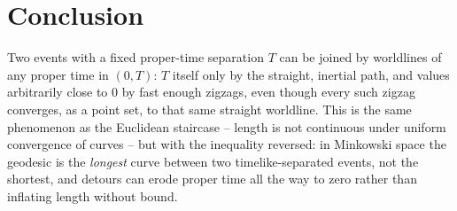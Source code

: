 \documentclass[11pt]{article}
\begin{document}
\section{Conclusion}

Two events with a fixed proper-time separation $T$ can be joined by
worldlines of any proper time in $(0,T)$: $T$ itself only by the straight,
inertial path, and values arbitrarily close to $0$ by fast enough zigzags,
even though every such zigzag converges, as a point set, to that same
straight worldline. This is the same phenomenon as the Euclidean staircase
-- length is not continuous under uniform convergence of curves -- but with
the inequality reversed: in Minkowski space the geodesic is the
\emph{longest} curve between two timelike-separated events, not the
shortest, and detours can erode proper time all the way to zero rather than
inflating length without bound.
\end{document}
